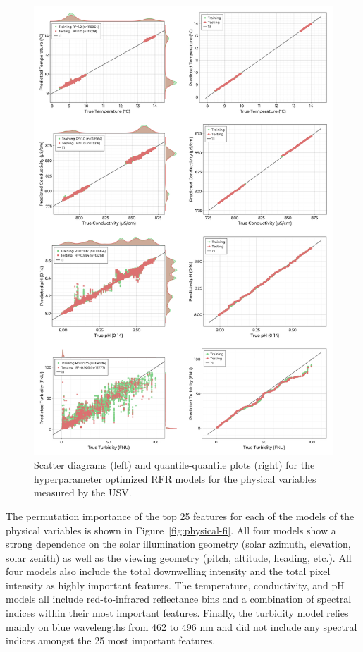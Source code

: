 \documentclass[remotesensing,article,submit,pdftex,moreauthors]{Definitions/mdpi}
\begin{document}
\begin{figure}
\centering
\includegraphics[width=\columnwidth]{paper/figures/results/fits/physical-fitres.png}
\caption{Scatter diagrams (left) and quantile-quantile plots (right) for the hyperparameter optimized RFR models for the physical variables measured by the USV.\label{fig:physical-fit}}
\end{figure}  

The permutation importance of the top 25 features for each of the models of the physical variables is shown in Figure~\ref{fig:physical-fi}. All four models show a strong dependence on the solar illumination geometry (solar azimuth, elevation, solar zenith) as well as the viewing geometry (pitch, altitude, heading, etc.). All four models also include the total downwelling intensity and the total pixel intensity as highly important features. The temperature, conductivity, and pH models all include red-to-infrared reflectance bins and a combination of spectral indices within their most important features. Finally, the turbidity model relies mainly on blue wavelengths from 462 to 496 nm and did not include any spectral indices amongst the 25 most important features.
\end{document}
